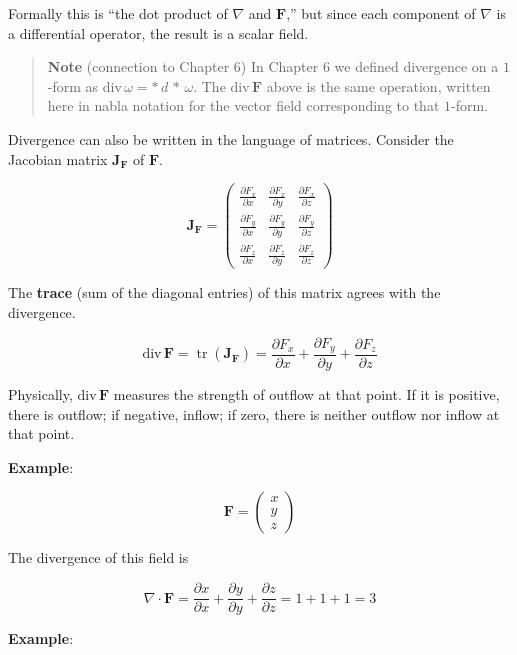 \documentclass[a4paper,12pt,openany]{book}
\begin{document}
Formally this is ``the dot product of \(\nabla\) and \(\mathbf{F}\),''
but since each component of \(\nabla\) is a differential operator, the
result is a scalar field.

\begin{quote}
\textbf{Note} (connection to Chapter 6) In Chapter 6 we defined
divergence on a \(1\)-form as
\(\mathrm{div}\,\omega = \ast\,d\,\ast\,\omega\). The
\(\mathrm{div}\,\mathbf{F}\) above is the same operation, written here
in nabla notation for the vector field corresponding to that \(1\)-form.
\end{quote}

Divergence can also be written in the language of matrices. Consider the
Jacobian matrix \(\mathbf{J}_\mathbf{F}\) of \(\mathbf{F}\).

\[\mathbf{J}_\mathbf{F} = \begin{pmatrix}
\frac{\partial F_x}{\partial x} & \frac{\partial F_x}{\partial y} & \frac{\partial F_x}{\partial z} \\[0.3em]
\frac{\partial F_y}{\partial x} & \frac{\partial F_y}{\partial y} & \frac{\partial F_y}{\partial z} \\[0.3em]
\frac{\partial F_z}{\partial x} & \frac{\partial F_z}{\partial y} & \frac{\partial F_z}{\partial z}
\end{pmatrix}\]

The \textbf{trace} (sum of the diagonal entries) of this matrix agrees
with the divergence.

\[\mathrm{div}\,\mathbf{F} = \operatorname{tr}(\mathbf{J}_\mathbf{F}) = \frac{\partial F_x}{\partial x} + \frac{\partial F_y}{\partial y} + \frac{\partial F_z}{\partial z}\]

Physically, \(\mathrm{div}\,\mathbf{F}\) measures the strength of
outflow at that point. If it is positive, there is outflow; if negative,
inflow; if zero, there is neither outflow nor inflow at that point.

\textbf{Example}:

\[
\mathbf{F}
=
\begin{pmatrix}
x\\
y\\
z
\end{pmatrix}
\]

The divergence of this field is

\[\nabla \cdot \mathbf{F} = \frac{\partial x}{\partial x} + \frac{\partial y}{\partial y} + \frac{\partial z}{\partial z} = 1 + 1 + 1 = 3\]

\textbf{Example}:
\end{document}
